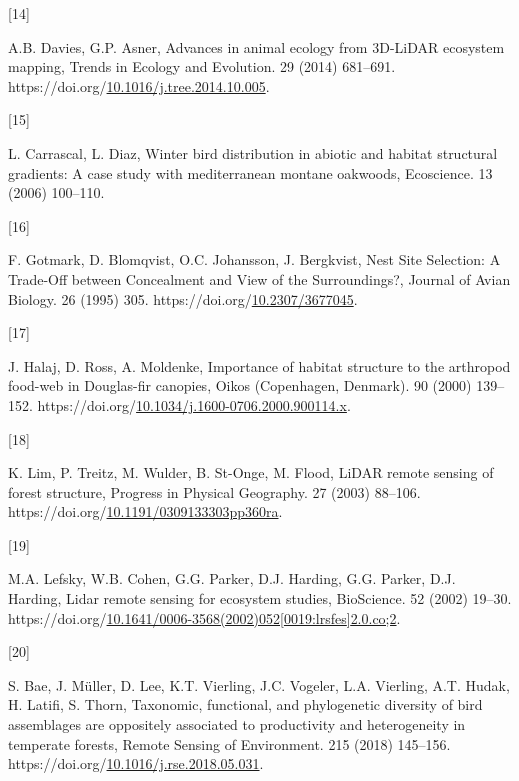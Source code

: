 \documentclass[manuscript, 3p, authoryear]{elsarticle} %
\newlength{\cslhangindent}
\newlength{\csllabelwidth}
\newlength{\cslentryspacingunit} %
\newenvironment{CSLReferences}[2] %
 {%
  \setlength{\parindent}{0pt}
  \ifodd #1
  \let\oldpar\par
  \def\par{\hangindent=\cslhangindent\oldpar}
  \fi
  \setlength{\parskip}{#2\cslentryspacingunit}
 }%
 {}
\newcommand{\CSLLeftMargin}[1]{\parbox[t]{\csllabelwidth}{#1}}
\newcommand{\CSLRightInline}[1]{\parbox[t]{\linewidth - \csllabelwidth}{#1}\break}
\begin{document}
\begin{CSLReferences}{0}{0}
\leavevmode{}%
\CSLLeftMargin{{[}14{]} }%
\CSLRightInline{A.B. Davies, G.P. Asner, Advances in animal ecology from {3D-LiDAR} ecosystem mapping, Trends in Ecology and Evolution. 29 (2014) 681--691. https://doi.org/\href{https://doi.org/10.1016/j.tree.2014.10.005}{10.1016/j.tree.2014.10.005}.}

\leavevmode{}%
\CSLLeftMargin{{[}15{]} }%
\CSLRightInline{L. Carrascal, L. Diaz, Winter bird distribution in abiotic and habitat structural gradients: A case study with mediterranean montane oakwoods, Ecoscience. 13 (2006) 100--110.}

\leavevmode{}%
\CSLLeftMargin{{[}16{]} }%
\CSLRightInline{F. Gotmark, D. Blomqvist, O.C. Johansson, J. Bergkvist, Nest {Site Selection}: {A Trade-Off} between {Concealment} and {View} of the {Surroundings}?, Journal of Avian Biology. 26 (1995) 305. https://doi.org/\href{https://doi.org/10.2307/3677045}{10.2307/3677045}.}

\leavevmode{}%
\CSLLeftMargin{{[}17{]} }%
\CSLRightInline{J. Halaj, D. Ross, A. Moldenke, Importance of habitat structure to the arthropod food-web in {Douglas-fir} canopies, Oikos (Copenhagen, Denmark). 90 (2000) 139--152. https://doi.org/\href{https://doi.org/10.1034/j.1600-0706.2000.900114.x}{10.1034/j.1600-0706.2000.900114.x}.}

\leavevmode{}%
\CSLLeftMargin{{[}18{]} }%
\CSLRightInline{K. Lim, P. Treitz, M. Wulder, B. St-Onge, M. Flood, {LiDAR} remote sensing of forest structure, Progress in Physical Geography. 27 (2003) 88--106. https://doi.org/\href{https://doi.org/10.1191/0309133303pp360ra}{10.1191/0309133303pp360ra}.}

\leavevmode{}%
\CSLLeftMargin{{[}19{]} }%
\CSLRightInline{M.A. Lefsky, W.B. Cohen, G.G. Parker, D.J. Harding, G.G. Parker, D.J. Harding, Lidar remote sensing for ecosystem studies, BioScience. 52 (2002) 19--30. https://doi.org/\href{https://doi.org/10.1641/0006-3568(2002)052\%5B0019:lrsfes\%5D2.0.co;2}{10.1641/0006-3568(2002)052{[}0019:lrsfes{]}2.0.co;2}.}

\leavevmode{}%
\CSLLeftMargin{{[}20{]} }%
\CSLRightInline{S. Bae, J. Müller, D. Lee, K.T. Vierling, J.C. Vogeler, L.A. Vierling, A.T. Hudak, H. Latifi, S. Thorn, Taxonomic, functional, and phylogenetic diversity of bird assemblages are oppositely associated to productivity and heterogeneity in temperate forests, Remote Sensing of Environment. 215 (2018) 145--156. https://doi.org/\href{https://doi.org/10.1016/j.rse.2018.05.031}{10.1016/j.rse.2018.05.031}.}


\end{CSLReferences}
\end{document}
